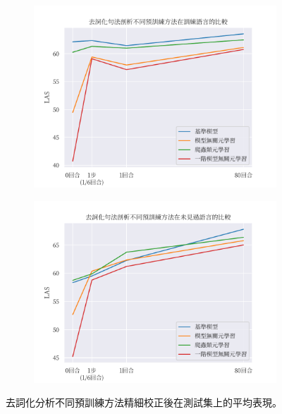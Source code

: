 \begin{figure}[htbp]
    \centering
    \begin{subfigure}[t]{\textwidth}
        \centering
        \includegraphics[width=\textwidth]{figs/chapter3/delex/delex_train_langs.pdf}
    \end{subfigure}
    \vspace{-12pt}
    \begin{subfigure}[t]{\textwidth}
        \centering
        \includegraphics[width=\textwidth]{figs/chapter3/delex/delex_test_langs.pdf}
    \end{subfigure}
    \caption{去詞化分析不同預訓練方法精細校正後在測試集上的平均表現。}
    \label{fig:delex_avg}
\end{figure}